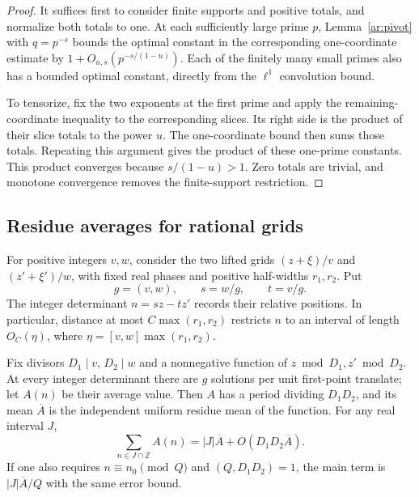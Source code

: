 \begin{proof}
It suffices first to consider finite supports and positive totals, and
normalize both totals to one. At each sufficiently large prime $p$,
Lemma~\ref{ar:pivot} with
$q=p^{-s}$ bounds the optimal constant in the corresponding
one-coordinate estimate by
$1+O_{u,s}(p^{-s/(1-u)})$. Each of the finitely many small primes also has
a bounded optimal constant, directly from the $\ell^1$ convolution bound.

To tensorize, fix the two exponents at the first prime and apply the
remaining-coordinate inequality to the corresponding slices. Its right
side is the product of their slice totals to the power $u$. The
one-coordinate bound then sums those totals. Repeating this argument gives
the product of these one-prime constants. This product converges because
$s/(1-u)>1$. Zero totals are trivial, and monotone convergence removes
the finite-support restriction.
\end{proof}

\subsection{Residue averages for rational grids}

For positive integers $v,w$, consider the two lifted grids
$(z+\xi)/v$ and $(z'+\xi')/w$, with fixed real phases and positive
half-widths $r_1,r_2$. Put
\[
 g=(v,w),\qquad s=w/g,\qquad t=v/g.
\]
The integer determinant $n=sz-tz'$ records their relative positions.
In particular, distance at most $C\max(r_1,r_2)$ restricts $n$ to an
interval of length $O_C(\eta)$, where
$\eta=[v,w]\max(r_1,r_2)$.

\begin{lemma}\label{ar:cycle}
Fix divisors $D_1\mid v$, $D_2\mid w$ and a nonnegative function of
$z\bmod D_1,z'\bmod D_2$. At every integer determinant there are $g$
solutions per unit first-point translate; let $A(n)$ be their average
value. Then $A$ has a period dividing $D_1D_2$, and its mean $\overline A$
is the independent uniform residue mean of the function. For any real
interval $J$,
\[
 \sum_{n\in J\cap\mathbb Z}A(n)
 =|J|\overline A+O(D_1D_2\overline A).
\]
If one also requires $n\equiv n_0\pmod Q$ and $(Q,D_1D_2)=1$, the main
term is $|J|\overline A/Q$ with the same error bound.
\end{lemma}

